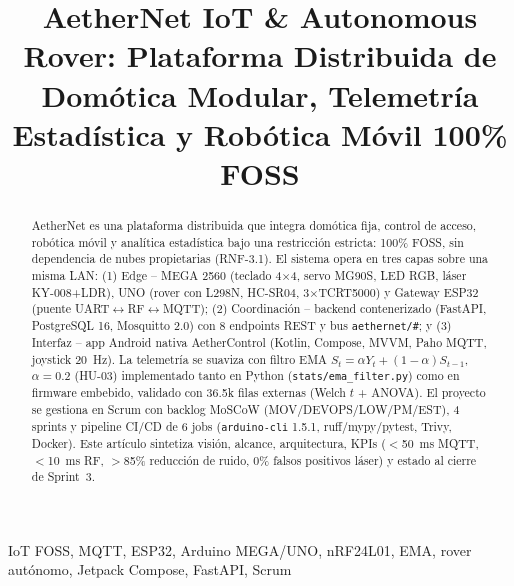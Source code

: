 \documentclass[conference]{IEEEtran}
\begin{document}
\title{AetherNet IoT \& Autonomous Rover: Plataforma Distribuida de Domótica Modular, Telemetría Estadística y Robótica Móvil 100\% FOSS}
\author{
\and
{}
}
\maketitle

\begin{abstract}
AetherNet es una plataforma distribuida que integra domótica fija, control de acceso, robótica móvil y analítica estadística bajo una restricción estricta: 100\% FOSS, sin dependencia de nubes propietarias (RNF-3.1). El sistema opera en tres capas sobre una misma LAN: (1) Edge -- MEGA 2560 (teclado 4$\times$4, servo MG90S, LED RGB, láser KY-008+LDR), UNO (rover con L298N, HC-SR04, 3$\times$TCRT5000) y Gateway ESP32 (puente UART$\leftrightarrow$RF$\leftrightarrow$MQTT); (2) Coordinación -- backend contenerizado (FastAPI, PostgreSQL 16, Mosquitto 2.0) con 8 endpoints REST y bus \texttt{aethernet/\#}; y (3) Interfaz -- app Android nativa AetherControl (Kotlin, Compose, MVVM, Paho MQTT, joystick 20~Hz). La telemetría se suaviza con filtro EMA $S_t=\alpha Y_t+(1-\alpha)S_{t-1}$, $\alpha=0.2$ (HU-03) implementado tanto en Python (\texttt{stats/ema\_filter.py}) como en firmware embebido, validado con 36.5k filas externas (Welch $t$ + ANOVA). El proyecto se gestiona en Scrum con backlog MoSCoW (MOV/DEVOPS/LOW/PM/EST), 4 sprints y pipeline CI/CD de 6 jobs (\texttt{arduino-cli} 1.5.1, ruff/mypy/pytest, Trivy, Docker). Este artículo sintetiza visión, alcance, arquitectura, KPIs ($<$50~ms MQTT, $<$10~ms RF, $>$85\% reducción de ruido, 0\% falsos positivos láser) y estado al cierre de Sprint~3.
\end{abstract}
\begin{IEEEkeywords}
IoT FOSS, MQTT, ESP32, Arduino MEGA/UNO, nRF24L01, EMA, rover autónomo, Jetpack Compose, FastAPI, Scrum
\end{IEEEkeywords}
\end{document}
